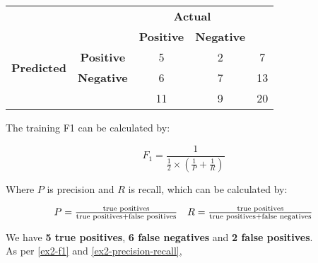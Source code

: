 \documentclass[12pt]{article}
\begin{document}
\begin{enumerate}[leftmargin=\labelsep]
\begin{center}
              \begin{tabular}{|c|c|c|c|c|}
                  \cline{3-4}
                  \multicolumn{2}{c}{}                & \multicolumn{2}{|c|}{\textbf{Actual}} & \multicolumn{1}{c}{}                             \\
                  \cline{3-4}
                  \multicolumn{2}{c|}{}               & \textbf{Positive}                     & \textbf{Negative}    & \multicolumn{1}{c}{}      \\
                  \hline
                  \multirow{2}{*}{\textbf{Predicted}} & \textbf{Positive}                     & 5                    & 2                    & 7  \\
                  \cline{2-5}
                                                      & \textbf{Negative}                     & 6                    & 7                    & 13 \\
                  \hline
                  \multicolumn{2}{c|}{}               & 11                                    & 9                    & 20                        \\
                  \cline{3-5}
              \end{tabular}
          \end{center}

          The training F1 can be calculated by:

          \begin{equation}\label{ex2-f1}
              F_1 = \frac{1}{\frac{1}{2} \times \left(\frac{1}{P} + \frac{1}{R}\right)}
          \end{equation}

          Where \(P\) is precision and \(R\) is recall, which can be calculated by:

          \begin{equation}\label{ex2-precision-recall}
              \begin{array}{l r}
                  P = \frac{\text{true positives}}{\text{true positives} + \text{false positives}}
                   & R = \frac{\text{true positives}}{\text{true positives} + \text{false negatives}}
              \end{array}
          \end{equation}

          We have \textbf{5 true positives}, \textbf{6 false negatives} and \textbf{2 false positives}.\\
          As per \eqref{ex2-f1} and \eqref{ex2-precision-recall},


\end{enumerate}
\end{document}
